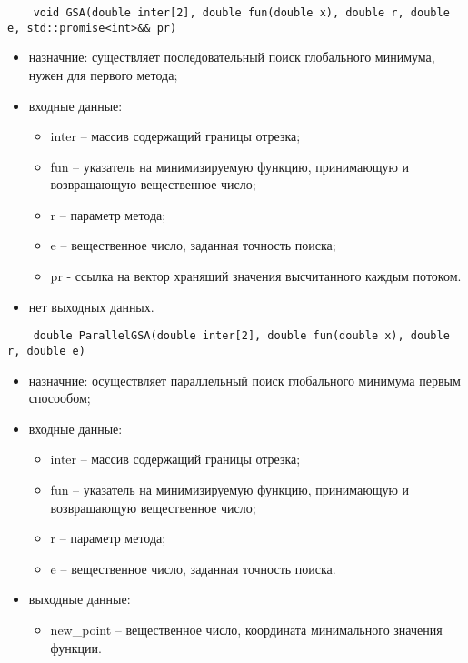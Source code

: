 \documentclass{report}
\begin{document}
\begin{lstlisting}
    void GSA(double inter[2], double fun(double x), double r, double e, std::promise<int>&& pr)
\end{lstlisting}
\begin{itemize}
    \item назначние: существляет последовательный поиск глобального минимума, нужен для первого метода;
    \item входные данные:
        \begin{itemize}	
            \item inter – массив содержащий границы отрезка;
            \item fun – указатель на минимизируемую функцию, принимающую и возвращающую вещественное число;
            \item r – параметр метода;
            \item e – вещественное число, заданная точность поиска;
            \item pr - ссылка на вектор хранящий значения высчитанного каждым потоком.
        \end{itemize}
    \item нет выходных данных.
\end{itemize}

\begin{lstlisting}
    double ParallelGSA(double inter[2], double fun(double x), double r, double e)
\end{lstlisting}
\begin{itemize}
    \item назначние: осуществляет параллельный поиск глобального минимума первым спосообом;
    \item входные данные:
        \begin{itemize}	
            \item inter – массив содержащий границы отрезка;
            \item fun – указатель на минимизируемую функцию, принимающую и возвращающую вещественное число;
            \item r – параметр метода;
            \item e – вещественное число, заданная точность поиска.
        \end{itemize}
    \item выходные данные:
        \begin{itemize}
            \item new\_point – вещественное число, координата минимального значения функции.
        \end{itemize}
\end{itemize}
\end{document}
